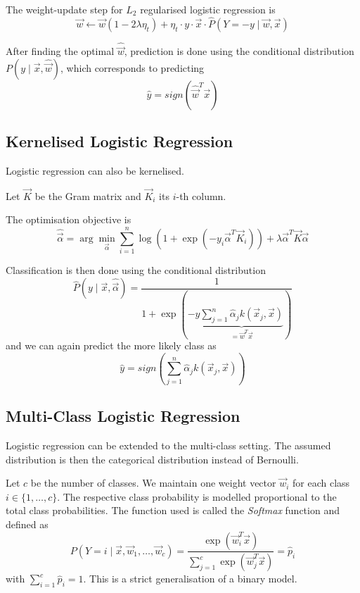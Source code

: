 The weight-update step for $L_2$ regularised
logistic regression is
\begin{equation*}
\vec{w} \gets \vec{w}(1 - 2 \lambda \eta_t) + \eta_t \cdot y \cdot \vec{x} \cdot \hat{P}(Y = -y \mid \vec{w}, \vec{x})
\end{equation*}

After finding the optimal $\hat{\vec{w}}$,
prediction is done using the conditional
distribution $P(y \mid \vec{x}, \hat{\vec{w}})$,
which corresponds to predicting
\begin{equation*}
\hat{y} = sign(\hat{\vec{w}}^T \vec{x})
\end{equation*}


\subsection{Kernelised Logistic Regression}
Logistic regression can also be kernelised.

Let $\vec{K}$ be the Gram matrix and
$\vec{K}_i$ its $i$-th column.

The optimisation objective is
\begin{equation*}
\hat{\vec{\alpha}} = \arg\min_{\vec{\alpha}}{
	\sum_{i=1}^n{
		\log{\left( 1 + \exp{(-y_i \vec{\alpha}^T \vec{K}_i)} \right)}
		+ \lambda \vec{\alpha}^T \vec{K} \vec{\alpha}
	}
}
\end{equation*}

Classification is then done using the conditional distribution
\begin{equation*}
\hat{P}(y \mid \vec{x}, \hat{\vec{\alpha}}) =
\frac{1}{1 + \exp{(-y 
		\underbrace{\sum_{j=1}^n{\hat{\alpha}_j k(\vec{x}_j, \vec{x})}}_{= \vec{w}^T \vec{x}}
		)}}
\end{equation*}
and we can again predict the more likely class as
\begin{equation*}
\hat{y} = sign\left(\sum_{j=1}^n{\hat{\alpha}_j k(\vec{x}_j, \vec{x})}\right)
\end{equation*}


\subsection{Multi-Class Logistic Regression}
Logistic regression can be extended to the
multi-class setting.
The assumed distribution is then
the categorical distribution instead
of Bernoulli.

Let $c$ be the number of classes.
We maintain one weight vector
$\vec{w}_i$ for each class $i \in \{1, \dotsc, c\}$.
The respective class probability is modelled
proportional to the total class probabilities.
The function used is called the
\emph{Softmax} function and defined as
\begin{equation*}
P(Y = i \mid \vec{x}, \vec{w}_1, \dotsc, \vec{w}_c)
= \frac{\exp{(\vec{w}_i^T \vec{x})}}{
	\sum_{j=1}^c{\exp{(\vec{w}_j^T \vec{x})}}
}
= \hat{p}_i
\end{equation*}
with $\sum_{i=1}^c{\hat{p}_i} = 1$.
This is a strict generalisation of a binary model.

